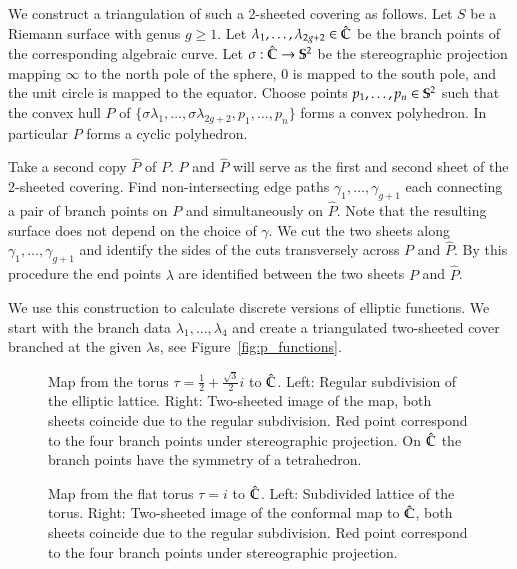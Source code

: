\documentclass[Thesis]{subfiles}
\begin{document}
We construct a triangulation of such a 2-sheeted covering as follows.
Let $S$ be a Riemann surface with genus $g\geq 1$.
Let $\lambda_1,\ldots,\lambda_{2g+2}\in \hat\C$ be the branch points of the corresponding algebraic curve.
Let $\sigma :\hat\C\to\S^2$ be the stereographic projection mapping $\infty$ to the north pole of the sphere, $0$ is mapped to the south pole, and the unit circle is mapped to the equator.
Choose points $p_1,\ldots,p_n\in\S^2$ such that the convex hull $P$ of $\{\sigma\lambda_1,\ldots,\sigma\lambda_{2g+2},p_1,\ldots,p_n\}$ forms a convex polyhedron.
In particular $P$ forms a cyclic polyhedron.

Take a second copy $\hat P$ of $P$. $P$ and $\hat P$ will serve as the first and second sheet of the 2-sheeted covering.
Find non-intersecting edge paths $\gamma_1,\ldots,\gamma_{g+1}$ each connecting a pair of branch points on $P$ and simultaneously on $\hat P$.
Note that the resulting surface does not depend on the choice of $\gamma$.
We cut the two sheets along $\gamma_1,\ldots,\gamma_{g+1}$ and identify the sides of the cuts transversely across $P$ and $\hat P$.
By this procedure the end points $\lambda$ are identified between the two sheets $P$ and $\hat P$.

We use this construction to calculate discrete versions of elliptic functions.
We start with the branch data $\lambda_1,\ldots,\lambda_{4}$ and create a triangulated two-sheeted cover branched at the given $\lambda$s, see Figure~\ref{fig:p_functions}.


\begin{figure}
\centering
{}
\caption{
Map from the torus $\tau=\frac{1}{2}+\frac{\sqrt 3}{2}i$ to $\Chat$. 
Left: Regular subdivision of the elliptic lattice. 
Right: Two-sheeted image of the map, both sheets coincide due to the regular subdivision. 
Red point correspond to the four branch points under stereographic projection.
On $\Chat$ the branch points have the symmetry of a tetrahedron.
} 
\label{fig:wente_elliptic}
\end{figure}

\begin{figure}
\centering
{}
\caption{
Map from the flat torus $\tau=i$ to $\Chat$. 
Left: Subdivided lattice of the torus. 
Right: Two-sheeted image of the conformal map to $\Chat$, both sheets coincide due to the regular subdivision. 
Red point correspond to the four branch points under stereographic projection.
}
\label{fig:square_elliptic} 
\end{figure}
\end{document}
